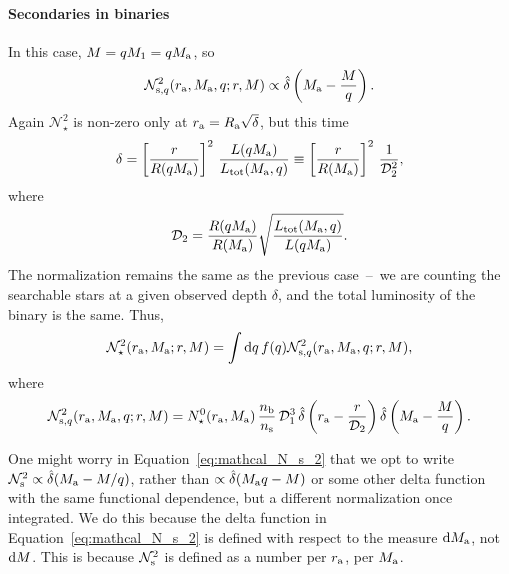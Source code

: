 \documentclass[12pt,modern]{aastex61}
\renewcommand{\a}{_{\rm a}}
\newcommand{\s}{_{\rm s}}
\renewcommand{\b}{_{\rm b}}
\begin{document}
\paragraph{Secondaries in binaries}
In this case, $M=qM_1=qM\a$, so
\begin{equation}
    \mathcal{N}_{{\rm s},q}^2(r\a, M\a, q; r, M)
    \propto \hat{\delta}\left(M\a-{M\over q}\right).
    \label{eq:fancyN_s_2_prop}
\end{equation}
Again $\mathcal{N}_\star^2$ is non-zero only at
$r\a=R\a\sqrt{\delta}$, but this time
\begin{equation}
      \delta =
      \left[{r\over R(qM\a)}\right]^2 \,
      {L(qM\a) \over L_{\rm tot}(M\a, q)}
      \equiv
      \left[{r\over R(M\a)}\right]^2\,
      \frac{1}{\mathcal{D}_2^2},
\end{equation}
where
\begin{equation}
  \mathcal{D}_2
  =
  \frac{R(qM\a)}{R(M\a)}
  \sqrt{ \frac{L_{\rm tot}(M\a,q)}{L(qM\a)} }.
\end{equation}
The normalization remains the same as the previous case~--~we are
counting the searchable stars at a given observed depth $\delta$, and
the total luminosity of the binary is the same.  Thus,
\begin{equation}
    \mathcal{N}_\star^2(r\a, M\a; r, M)
    =\int \mathrm{d}q\,f(q)\mathcal{N}_{{\rm s}, q}^2(r\a, M\a, q; r, M),
\end{equation}
where
\begin{align}
    \mathcal{N}_{{\rm s},q}^2(r\a, M\a, q; r, M)
    =N_\star^0(r\a, M\a) \, \frac{n\b}{n\s} 
    \, \mathcal{D}_1^3
    \, \hat{\delta} \left(r\a-\frac{r}{\mathcal{D}_2}\right)
    \hat{\delta} \left(M\a-{M\over q}\right).
    \label{eq:mathcal_N_s_2}
\end{align}

One might worry in Equation~\ref{eq:mathcal_N_s_2} that we opt to
write $\mathcal{N}\s^2 \propto \hat{\delta}(M\a - M/q)$, rather than
$\propto \hat{\delta}(M\a q - M)$ or some other delta function with the same
functional dependence, but a different normalization once integrated.
We do this because the delta function in
Equation~\ref{eq:mathcal_N_s_2} is defined with respect to the measure
${\rm d}M\a$, not ${\rm d}M$.  This is because $\mathcal{N}\s^2$ is
defined as a number per $r\a$, per $M\a$.
\end{document}
